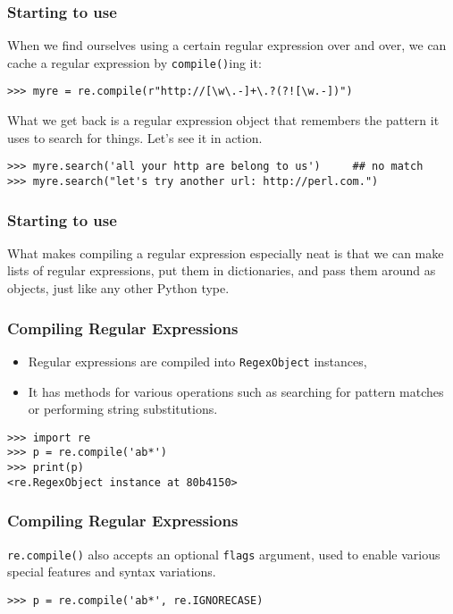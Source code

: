  \begin{frame}[fragile]
\frametitle{Starting to use}
When we find ourselves using a certain regular expression over and
over, we can cache a regular expression by \lstinline{compile()}ing it:
\begin{lstlisting}
>>> myre = re.compile(r"http://[\w\.-]+\.?(?![\w.-])")
\end{lstlisting}
What we get back is a regular expression object that remembers the
pattern it uses to search for things.  Let's see it in action.
\begin{lstlisting}
>>> myre.search('all your http are belong to us')     ## no match
>>> myre.search("let's try another url: http://perl.com.")
\end{lstlisting}

\end{frame}

 \begin{frame}[fragile]
\frametitle{Starting to use}
What makes compiling a regular expression especially neat is that we
can make lists of regular expressions, put them in dictionaries, and
pass them around as objects, just like any other Python type.
\end{frame}


 \begin{frame}[fragile]
\frametitle{Compiling Regular Expressions } 

\begin{itemize}
\item Regular expressions are compiled into \lstinline|RegexObject| instances,
\item It has methods for various operations such as searching for
pattern matches or performing string substitutions.
\end{itemize}
\begin{lstlisting}
>>> import re
>>> p = re.compile('ab*')
>>> print(p)
<re.RegexObject instance at 80b4150>
\end{lstlisting}
\end{frame}

 \begin{frame}[fragile]
\frametitle{Compiling Regular Expressions } 
 \lstinline{re.compile()} also accepts an optional \lstinline{flags}
argument, used to enable various special features and syntax
variations.  

\begin{lstlisting}
>>> p = re.compile('ab*', re.IGNORECASE)
\end{lstlisting}
\end{frame}

